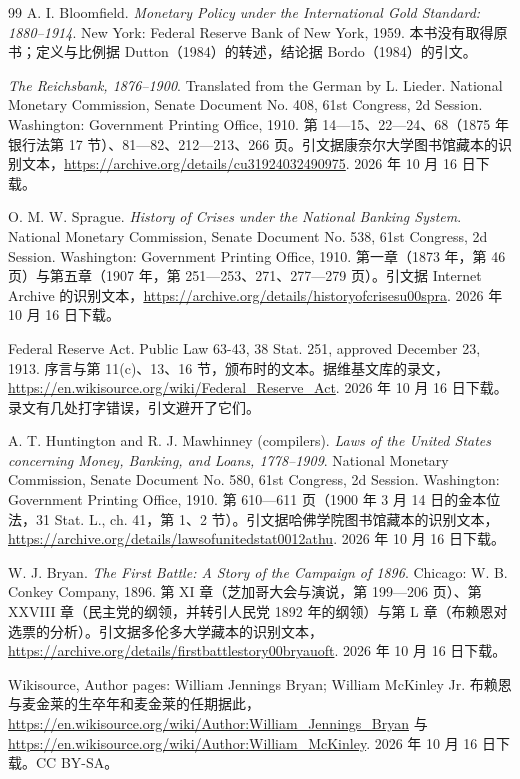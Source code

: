 \begin{thebibliography}{99}
 A. I. Bloomfield. \emph{Monetary Policy under the International Gold Standard: 1880--1914}. New York: Federal Reserve Bank of New York, 1959. 本书没有取得原书；定义与比例据 Dutton（1984）的转述，结论据 Bordo（1984）的引文。

 \emph{The Reichsbank, 1876--1900}. Translated from the German by L. Lieder. National Monetary Commission, Senate Document No. 408, 61st Congress, 2d Session. Washington: Government Printing Office, 1910. 第 14—15、22—24、68（1875 年银行法第 17 节）、81—82、212—213、266 页。引文据康奈尔大学图书馆藏本的识别文本，\url{https://archive.org/details/cu31924032490975}. 2026 年 10 月 16 日下载。

 O. M. W. Sprague. \emph{History of Crises under the National Banking System}. National Monetary Commission, Senate Document No. 538, 61st Congress, 2d Session. Washington: Government Printing Office, 1910. 第一章（1873 年，第 46 页）与第五章（1907 年，第 251—253、271、277—279 页）。引文据 Internet Archive 的识别文本，\url{https://archive.org/details/historyofcrisesu00spra}. 2026 年 10 月 16 日下载。

 Federal Reserve Act. Public Law 63-43, 38 Stat. 251, approved December 23, 1913. 序言与第 11(c)、13、16 节，颁布时的文本。据维基文库的录文，\url{https://en.wikisource.org/wiki/Federal_Reserve_Act}. 2026 年 10 月 16 日下载。录文有几处打字错误，引文避开了它们。

 A. T. Huntington and R. J. Mawhinney (compilers). \emph{Laws of the United States concerning Money, Banking, and Loans, 1778--1909}. National Monetary Commission, Senate Document No. 580, 61st Congress, 2d Session. Washington: Government Printing Office, 1910. 第 610—611 页（1900 年 3 月 14 日的金本位法，31 Stat. L., ch. 41，第 1、2 节）。引文据哈佛学院图书馆藏本的识别文本，\url{https://archive.org/details/lawsofunitedstat0012athu}. 2026 年 10 月 16 日下载。

 W. J. Bryan. \emph{The First Battle: A Story of the Campaign of 1896}. Chicago: W. B. Conkey Company, 1896. 第 XI 章（芝加哥大会与演说，第 199—206 页）、第 XXVIII 章（民主党的纲领，并转引人民党 1892 年的纲领）与第 L 章（布赖恩对选票的分析）。引文据多伦多大学藏本的识别文本，\url{https://archive.org/details/firstbattlestory00bryauoft}. 2026 年 10 月 16 日下载。

 Wikisource, Author pages: William Jennings Bryan; William McKinley Jr. 布赖恩与麦金莱的生卒年和麦金莱的任期据此，\url{https://en.wikisource.org/wiki/Author:William_Jennings_Bryan} 与 \url{https://en.wikisource.org/wiki/Author:William_McKinley}. 2026 年 10 月 16 日下载。CC BY-SA。


\end{thebibliography}
